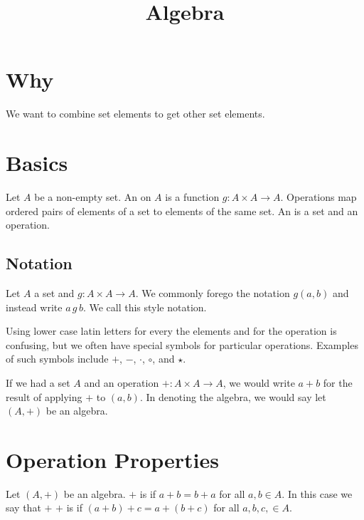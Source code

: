 






\title{Algebra}

\section{Why}

We want to combine set elements to get other set elements.

\section{Basics}


Let $A$ be a non-empty set.
An  on $A$ is a function $g: A \times A \to A$.
Operations map ordered pairs of elements of a set to elements of the same set.
An  is a set and an operation.


\subsection{Notation}

Let $A$ a set and $g: A \times A \to A$.
We commonly forego the notation $g(a, b)$ and instead write $a\,g\,b$.
We call this style  notation.

Using lower case latin letters for every the elements and for the operation is confusing, but we often have special symbols for particular operations.
Examples of such symbols include $+$, $-$, $\cdot$, $\circ$, and $\star$.

If we had a set $A$ and an operation $+: A \times A \to A$, we would write $a+b$ for the result of applying $+$ to $(a,b)$.
In denoting the algebra, we would say let $(A, +)$ be an algebra.

\section{Operation Properties}

Let $(A, +)$ be an algebra.
$+$ is  if $a + b = b + a$ for all $a, b \in A$.
In this case we say that $+$ 
$+$ is  if $(a + b) + c = a + (b + c)$ for all $a, b, c, \in A$.



